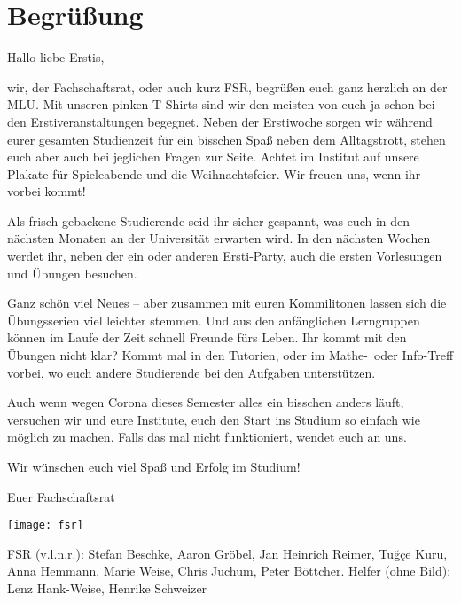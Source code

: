 \section{Begrüßung}

\begin{spacing}{1.5}
    \setlength{\parskip}{1.65ex}

    Hallo liebe Erstis,

    wir, der Fachschaftsrat, oder auch kurz FSR, 
    begrüßen euch ganz herzlich an der MLU.
    Mit unseren pinken T-Shirts sind wir den meisten 
    von euch ja schon bei den Erstiveranstaltungen begegnet.
    Neben der Erstiwoche sorgen wir während eurer gesamten Studienzeit
    für ein bisschen Spaß neben dem Alltagstrott, 
    stehen euch aber auch bei jeglichen Fragen zur Seite.
    Achtet im Institut auf unsere Plakate für Spieleabende und die Weihnachtsfeier.
    Wir freuen uns, wenn ihr vorbei kommt!

    Als frisch gebackene Studierende seid ihr sicher gespannt, 
    was euch in den nächsten Monaten 
    an der Universität erwarten wird. 
    In den nächsten Wochen werdet ihr, 
    neben der ein oder anderen Ersti-Party,
    auch die ersten Vorlesungen und Übungen besuchen.

    Ganz schön viel Neues -- 
    aber zusammen mit euren Kommilitonen 
    lassen sich die Übungsserien viel leichter stemmen.
    Und aus den anfänglichen Lerngruppen 
    können im Laufe der Zeit schnell Freunde fürs Leben.
    Ihr kommt mit den Übungen nicht klar? 
    Kommt mal in den Tutorien, 
    oder im Mathe-~oder Info-Treff vorbei, 
    wo euch andere Studierende bei den Aufgaben unterstützen.

    Auch wenn wegen Corona dieses Semester alles ein bisschen anders läuft,
    versuchen wir und eure Institute, euch den Start ins Studium 
    so einfach wie möglich zu machen. Falls das mal nicht funktioniert, wendet euch an uns.

    Wir wünschen euch viel Spaß und Erfolg im Studium!

    Euer Fachschaftsrat \\
\end{spacing}

\begin{center}
    \texttt{[image: fsr]}
\end{center}%
FSR (v.l.n.r.): 
Stefan Beschke,
Aaron Gröbel, 
Jan Heinrich Reimer,  
Tuğçe Kuru, 
Anna Hemmann,
Marie Weise, 
Chris Juchum,  
Peter Böttcher.
Helfer (ohne Bild): Lenz Hank-Weise, Henrike Schweizer


